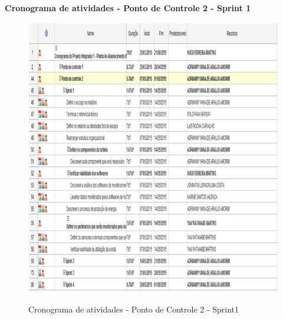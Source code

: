    \pagebreak
   \textbf{Cronograma de atividades - Ponto de Controle 2 - Sprint 1}
   \begin{figure}[!h]
    \centering
    \includegraphics[scale = 0.8]{editaveis/figuras/cronogramaPC2}
    \label{Cronograma de atividades PC2S1}
    \caption{Cronograma de atividades - Ponto de Controle 2 - Sprint1}
   \end{figure}
   \FloatBarrier
   
